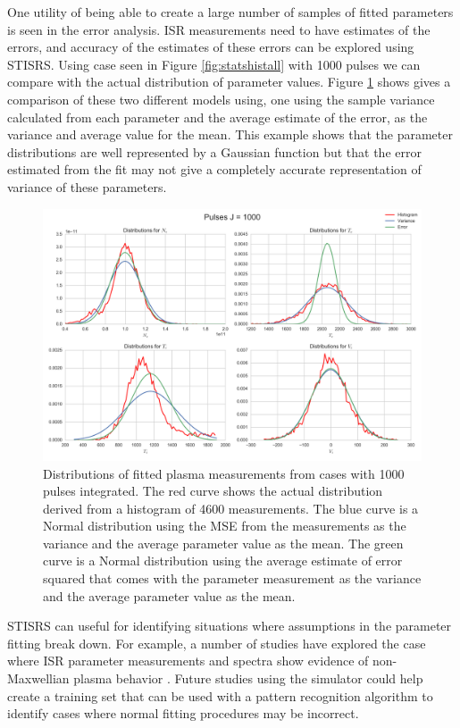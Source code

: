 \documentclass[draft,ras]{agutex}
\begin{document}
\begin{article}
One utility of being able to create a large number of samples of fitted parameters is seen in the error analysis. ISR measurements need to have estimates of the errors, and accuracy of the estimates of these errors can be explored using STISRS. Using case seen in Figure \ref{fig:statshistall} with 1000 pulses we can compare with the actual distribution of parameter values. Figure \ref{fig:statshistsingle} shows gives a comparison of these two different models using, one using the sample variance calculated from each parameter and the average estimate of the error, as the variance and average value for the mean. This example shows that the parameter distributions are well represented by a Gaussian function but that the error estimated from the fit may not give a completely accurate representation of variance of these parameters. 

\begin{figure}[!t]
\centering
\includegraphics[width=5in]{histsingle}
\caption{Distributions of fitted plasma measurements from cases with 1000 pulses integrated. The red curve shows the actual distribution derived from a histogram of 4600 measurements. The blue curve is a Normal distribution using the MSE from the measurements as the variance and the average parameter value as the mean.  The green curve is a Normal distribution using the average estimate of error squared that comes with the parameter measurement as the variance and the average parameter value as the mean.}
\label{fig:statshistsingle}
\end{figure}


STISRS can useful for identifying situations where assumptions in the parameter fitting break down. For example, a number of studies have explored the case where ISR parameter measurements and spectra show evidence of non-Maxwellian plasma behavior \citep[see, e.g.,][for AMISR examples]{Akbari:2012dz,Akbari:2015fv}. Future studies using the simulator could help create a training set that can be used with a pattern recognition algorithm to identify cases where normal fitting procedures may be incorrect.


\end{article}
\end{document}
